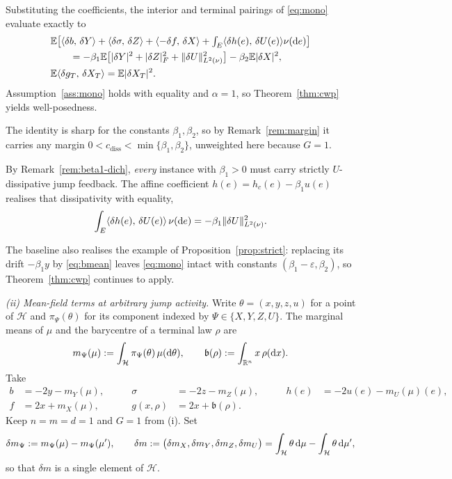 \begin{example}
Substituting the coefficients, the interior and terminal pairings of \eqref{eq:mono} evaluate
exactly to
\[
\begin{aligned}
&\mathbb{E}\big[\langle \delta b,\,\delta Y\rangle+\langle \delta\sigma,\,\delta Z\rangle+\langle -\delta f,\,\delta X\rangle
+\textstyle\int_E\langle \delta h(e),\,\delta U(e)\rangle\nu(\mathrm{d} e)\big]\\
&\qquad=-\beta_1\mathbb{E}\big[|\delta Y|^2+|\delta Z|_F^2+\lVert \delta U\rVert_{L^2(\nu)}^2\big]-\beta_2\mathbb{E}|\delta X|^2,\\
&\mathbb{E}\langle \delta g_T,\,\delta X_T\rangle=\mathbb{E}|\delta X_T|^2 .
\end{aligned}
\]
Assumption~\ref{ass:mono} holds with equality and $\alpha=1$, so Theorem~\ref{thm:cwp}
yields well-posedness.

The identity is sharp for the constants $\beta_1,\beta_2$, so by Remark~\ref{rem:margin} it
carries any margin $0<c_{\mathrm{diss}}<\min\{\beta_1,\beta_2\}$, unweighted here because
$G=1$.

By Remark~\ref{rem:beta1-dich}, \emph{every} instance with $\beta_1>0$ must carry strictly
$U$-dissipative jump feedback. The affine coefficient $h(e)=h_c(e)-\beta_1u(e)$ realises that
dissipativity with equality,
\[
\int_E\langle \delta h(e),\,\delta U(e)\rangle\,\nu(\mathrm{d} e)=-\beta_1\lVert \delta U\rVert_{L^2(\nu)}^2 .
\]

The baseline also realises the example of Proposition~\ref{prop:strict}: replacing its
drift $-\beta_1y$ by \eqref{eq:bmean} leaves \eqref{eq:mono} intact with constants
$(\beta_1-\varepsilon,\beta_2)$, so Theorem~\ref{thm:cwp} continues to apply.

\smallskip
\emph{(ii) Mean-field terms at arbitrary jump activity.} Write $\theta=(x,y,z,u)$ for a point
of $\mathcal H$ and $\pi_\Psi(\theta)$ for its component indexed by
$\Psi\in\{X,Y,Z,U\}$. The marginal
means of $\mu$ and the barycentre of a terminal law $\rho$ are
\[
m_\Psi(\mu):=\int_{\mathcal H}\pi_\Psi(\theta)\,\mu(\mathrm{d}\theta),\qquad
\mathfrak b(\rho):=\int_{\mathbb{R}^n}x\,\rho(\mathrm{d} x) .
\]
Take
\[
\begin{aligned}
b&=-2y-m_Y(\mu), &\qquad \sigma&=-2z-m_Z(\mu), &\qquad h(e)&=-2u(e)-m_U(\mu)(e),\\
f&=2x+m_X(\mu), &\qquad g(x,\rho)&=2x+\mathfrak b(\rho) .
\end{aligned}
\]
Keep $n=m=d=1$ and $G=1$ from (i). Set
\[
\delta m_\Psi:=m_\Psi(\mu)-m_\Psi(\mu'),\qquad
\delta m:=\big(\delta m_X,\delta m_Y,\delta m_Z,\delta m_U\big)
=\int_{\mathcal H}\theta\,\mathrm{d}\mu-\int_{\mathcal H}\theta\,\mathrm{d}\mu' ,
\]
so that $\delta m$ is a single element of $\mathcal H$.


\end{example}
